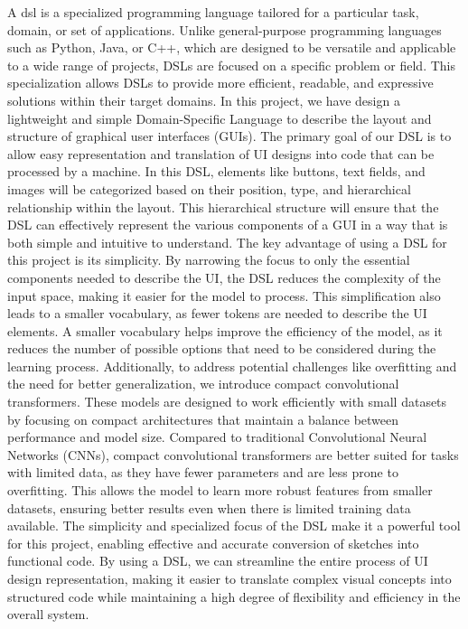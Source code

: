 A \gls{dsl} is a specialized programming language tailored for a particular task, domain, or set of applications. Unlike general-purpose programming languages such as Python, Java, or C++, which are designed to be versatile and applicable to a wide range of projects, DSLs are focused on a specific problem or field. This specialization allows DSLs to provide more efficient, readable, and expressive solutions within their target domains.
In this project, we have design a lightweight and simple Domain-Specific Language to describe the layout and structure of graphical user interfaces (GUIs). The primary goal of our DSL is to allow easy representation and translation of UI designs into code that can be processed by a machine. In this DSL, elements like buttons, text fields, and images will be categorized based on their position, type, and hierarchical relationship within the layout. This hierarchical structure will ensure that the DSL can effectively represent the various components of a GUI in a way that is both simple and intuitive to understand.
The key advantage of using a DSL for this project is its simplicity. By narrowing the focus to only the essential components needed to describe the UI, the DSL reduces the complexity of the input space, making it easier for the model to process. This simplification also leads to a smaller vocabulary, as fewer tokens are needed to describe the UI elements. A smaller vocabulary helps improve the efficiency of the model, as it reduces the number of possible options that need to be considered during the learning process.
Additionally, to address potential challenges like overfitting and the need for better generalization, we introduce compact convolutional transformers. These models are designed to work efficiently with small datasets by focusing on compact architectures that maintain a balance between performance and model size. Compared to traditional Convolutional Neural Networks (CNNs), compact convolutional transformers are better suited for tasks with limited data, as they have fewer parameters and are less prone to overfitting. This allows the model to learn more robust features from smaller datasets, ensuring better results even when there is limited training data available.
The simplicity and specialized focus of the DSL make it a powerful tool for this project, enabling effective and accurate conversion of sketches into functional code. By using a DSL, we can streamline the entire process of UI design representation, making it easier to translate complex visual concepts into structured code while maintaining a high degree of flexibility and efficiency in the overall system.

